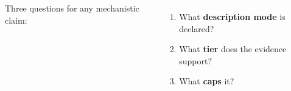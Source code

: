 \documentclass[28pt, a0paper, portrait]{tikzposter}
\begin{document}
\begin{columns}
{  \vspace{5mm}
  Three questions for any mechanistic claim:
  \begin{enumerate}[leftmargin=*, itemsep=2mm]
    \item What \textbf{description mode} is declared?
    \item What \textbf{tier} does the evidence support?
    \item What \textbf{caps} it?
  \end{enumerate}
}

\end{columns}

\begin{columns}


\end{columns}
\end{document}
